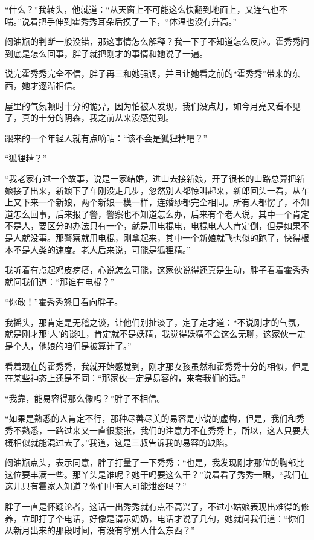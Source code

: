 “什么？”我转头，他就道：“从天窗上不可能这么快翻到地面上，又连气也不喘。”说着把手伸到霍秀秀耳朵后摸了一下，“体温也没有升高。”

闷油瓶的判断一般没错，那这事情怎么解释？我一下子不知道怎么反应。霍秀秀问到底是怎么回事，胖子就把刚才的事情和她说了一遍。

说完霍秀秀完全不信，胖子再三和她强调，并且让她看之前的“霍秀秀”带来的东西，她才逐渐相信。

屋里的气氛顿时十分的诡异，因为怕被人发现，我们没点灯，如今月亮又看不见了，真的十分的阴森，我之前从来没感觉到。

跟来的一个年轻人就有点嘀咕：“该不会是狐狸精吧？”

“狐狸精？”

“我老家有过一个故事，说是一家结婚，进山去接新娘，开了很长的山路总算把新娘接了出来，新娘下了车刚没走几步，忽然别人都惊叫起来，新郎回头一看，从车上又下来一个新娘，两个新娘一模一样，连婚纱都完全相同。所有人都愣了，不知道怎么回事，后来报了警，警察也不知道怎么办，后来有个老人说，其中一个肯定不是人，要区分的办法只有一个，就是用电棍电，电棍电人人肯定倒，但是如果不是人就没事。那警察就用电棍，刚拿起来，其中一个新娘就飞也似的跑了，快得根本不是人类的速度。老人后来说，可能是狐狸精。”

我听着有点起鸡皮疙瘩，心说怎么可能，这家伙说得还真是生动，胖子看着霍秀秀就问我们道：“那谁有电棍？”

“你敢！”霍秀秀怒目看向胖子。

我摇头，那肯定是无稽之谈，让他们别扯淡了，定了定才道：“不说刚才的气氛，就是刚才那‘人’的谈吐，肯定就不是妖精，我觉得妖精不会这么无聊，这家伙一定是个人，他娘的咱们是被算计了。”

看着现在的霍秀秀，我就开始感觉到，刚才那女孩虽然和霍秀秀十分的相似，但是在某些神态上还是不同：“那家伙一定是易容的，来套我们的话。”

“我靠，能易容得那么像吗？”胖子不相信。

“如果是熟悉的人肯定不行，那种尽善尽美的易容是小说的虚构，但是，我们和秀秀不熟悉，一路过来又一直很紧张，我们的注意力不在秀秀上，所以，这人只要大概相似就能混过去了。”我道，这是三叔告诉我的易容的缺陷。

闷油瓶点头，表示同意，胖子打量了一下秀秀：“也是，我发现刚才那位的胸部比这位要丰满一些。那丫头是谁呢？她干吗要这么干？”说着看了秀秀一眼，“我们在这儿只有霍家人知道？你们中有人可能泄密吗？”

胖子一直是怀疑论者，这话一出秀秀就有点不高兴了，不过小姑娘表现出难得的修养，立即打了个电话，好像是请示奶奶，电话才说了几句，她就问我们道：“你们从新月出来的那段时间，有没有拿别人什么东西？”

